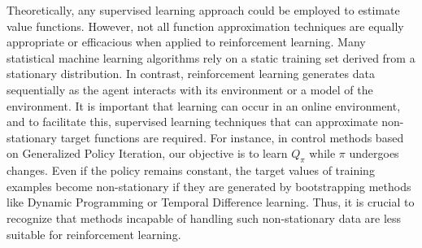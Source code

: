Theoretically, any supervised learning approach could be employed to estimate value functions. However, not all function approximation techniques are equally appropriate or efficacious when applied to reinforcement learning. Many statistical machine learning algorithms rely on a static training set derived from a stationary distribution. In contrast, reinforcement learning generates data sequentially as the agent interacts with its environment or a model of the environment. It is important that learning can occur in an online environment, and to facilitate this, supervised learning techniques that can approximate non-stationary target functions are required.
For instance, in control methods based on Generalized Policy Iteration, our objective is to learn $Q_{\pi}$ while $\pi$ undergoes changes. Even if the policy remains constant, the target values of training examples become non-stationary if they are generated by bootstrapping methods like Dynamic Programming or Temporal Difference learning. Thus, it is crucial to recognize that methods incapable of handling such non-stationary data are less suitable for reinforcement learning.
